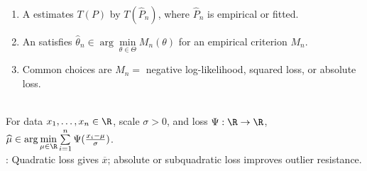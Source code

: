 \begin{definition} \label{def:plug-in-estimator-and-m-estimator} 
\begin{enumerate}[label=(\roman*)]
\setlength{\itemsep}{0pt}
\item A  estimates $T(P)$ by $T(\widehat{P}_n)$, where $\widehat{P}_n$ is empirical or fitted.
\item An  satisfies $\widehat{\theta}_n\in\arg\min\limits_{\theta\in\Theta}M_n(\theta)$ for an empirical criterion $M_n$.
\item Common choices are $M_n=$ negative log-likelihood, squared loss, or absolute loss.
\end{enumerate}
\end{definition}

\begin{definition} \label{def:m-estimates-location} \\
For data $x_1,\ldots,x_n\in\R$, scale $\sigma>0$, and loss $\Psi:\R\to\R$, $\widehat{\mu}\in\arg\min\limits_{\mu\in\R}\sum\limits_{i=1}^n\Psi(\frac{x_i-\mu}{\sigma})$.\\
: Quadratic loss gives $\overline{x}$; absolute or subquadratic loss improves outlier resistance.
\end{definition}
